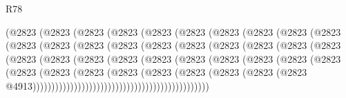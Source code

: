 \begin{lexlean}{R78}
\begin{coremodule}
                    (@2823
                      (@2823
                        (@2823
                          (@2823
                            (@2823
                              (@2823
                                (@2823
                                  (@2823
                                    (@2823
                                      (@2823
                                        (@2823
                                          (@2823
                                            (@2823
                                              (@2823
                                                (@2823
                                                  (@2823
                                                    (@2823
                                                      (@2823
                                                        (@2823
                                                          (@2823
                                                            (@2823
                                                              (@2823
                                                                (@2823
                                                                  (@2823
                                                                    (@2823
                                                                      (@2823
                                                                        (@2823
                                                                          (@2823
                                                                            (@2823
                                                                              (@2823
                                                                                (@2823
                                                                                  (@2823
                                                                                    (@2823
                                                                                      (@2823
                                                                                        (@2823
                                                                                          (@2823
                                                                                            (@2823
                                                                                              (@2823
                                                                                                (@2823
                                                                                                  @4913)))))))))))))))))))))))))))))))))))))))))))))))

\end{coremodule}
\end{lexlean}
